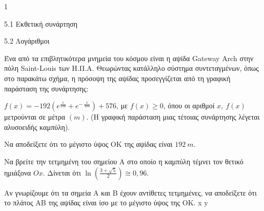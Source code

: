 \begin{ylh}{1}
\item 5.1 Εκθετική συνάρτηση
\item 5.2 Λογάριθμοι
\end{ylh}
Ένα από τα επιβλητικότερα μνημεία του κόσμου είναι η αψίδα Gateway Arch στην πόλη Saint-Louis των Η.Π.Α. Θεωρώντας κατάλληλο σύστημα συντεταγμένων, όπως στο παρακάτω σχήμα, η πρόσοψη της αψίδας προσεγγίζεται από τη γραφική παράσταση της συνάρτησης:

\begin{center}
\end{center}
$f(x) = - 192\left( e^{\frac{x}{100}} + e^{- \ \frac{x}{100}} \right) + 576$,
με $f(x) \geq 0$, όπου οι αριθμοί $x,\ f(x)$ μετρούνται σε μέτρα $(m)$.
(Η γραφική παράσταση μιας τέτοιας συνάρτησης λέγεται αλυσοειδής καμπύλη).
\begin{alist}
\item Να αποδείξετε ότι το μέγιστο ύψος ΟΚ της αψίδας είναι $192\ m$.
\item Να βρείτε την τετμημένη του σημείου Α στο οποίο η καμπύλη τέμνει τον θετικό ημιάξονα $Οx$. Δίνεται ότι $\ln\left( \frac{3 + \sqrt{5}}{2} \right) \cong 0,96$.
\item Αν γνωρίζουμε ότι τα σημεία Α και Β έχουν αντίθετες τετμημένες, να αποδείξετε ότι το πλάτος ΑΒ της αψίδας είναι ίσο με το μέγιστο ύψος της ΟΚ.
x
y
\end{alist}

